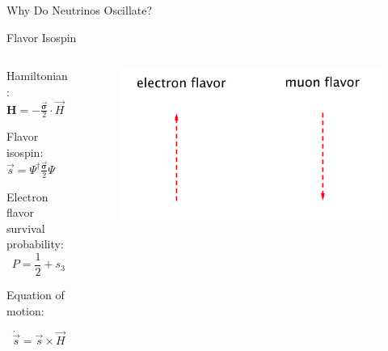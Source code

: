 \documentclass[9pt]{beamer}
\begin{document}
\begin{darkframes}
\begin{frame}[fragile]{Why Do Neutrinos Oscillate?}
\begin{tcolorbox}[standard jigsaw, opacityback=0,coltext=white]
\begin{itemize}
\end{itemize}


\end{tcolorbox}






\end{frame}



\begin{frame}{Flavor Isospin}








\begin{columns}[T]
\begin{column}{0.5\textwidth}


Hamiltonian: $\mathbf H = - \frac{\vec{\boldsymbol{\sigma}} }{2}\cdot \vec H$


Flavor isospin: $\vec s = \Psi^{\dagger} \frac{\vec{\boldsymbol{\sigma}} }{2} \Psi $

\small
Electron flavor survival probability:
\vspace*{0pt}
\begin{equation*}
P = \frac{1}{2} + s_3
\end{equation*}


Equation of motion:

\begin{equation*}
\dot{\vec s} = \vec s \times \vec H
\end{equation*}




\end{column}%
\begin{column}{0.5\textwidth}

\begin{figure}
    \centering
    \includegraphics[width=\textwidth]{assets/flavor-isospin-illus}
\end{figure}


\end{column}
\end{columns}
\end{frame}
\end{darkframes}
\end{document}

